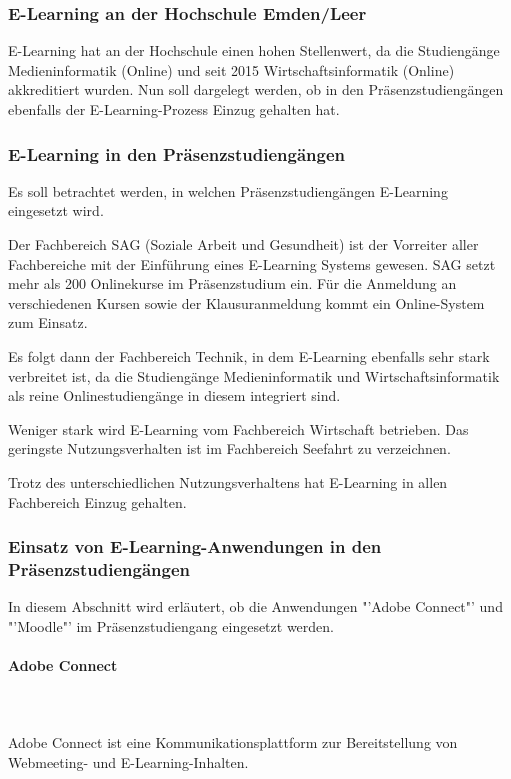 \subsubsection{E-Learning an der Hochschule Emden/Leer}
E-Learning hat an der Hochschule einen hohen Stellenwert, da die Studiengänge Medieninformatik (Online) und seit 2015 Wirtschaftsinformatik (Online) akkreditiert  wurden. Nun soll dargelegt werden, ob in den Präsenzstudiengängen ebenfalls der E-Learning-Prozess Einzug gehalten hat.

\subsubsection{E-Learning in den Präsenzstudiengängen}
Es soll betrachtet werden, in welchen Präsenzstudiengängen E-Learning eingesetzt wird.

Der Fachbereich SAG (Soziale Arbeit und Gesundheit) ist der Vorreiter aller Fachbereiche mit der Einführung eines E-Learning Systems gewesen. SAG setzt mehr als 200 Onlinekurse im Präsenzstudium ein. Für die Anmeldung an verschiedenen Kursen sowie der Klausuranmeldung kommt ein Online-System zum Einsatz.

Es folgt dann der Fachbereich Technik, in dem E-Learning ebenfalls sehr stark verbreitet ist, da die Studiengänge Medieninformatik und Wirtschaftsinformatik als reine Onlinestudiengänge in diesem integriert sind.

Weniger stark wird E-Learning vom Fachbereich Wirtschaft betrieben. Das geringste Nutzungsverhalten ist im Fachbereich Seefahrt zu verzeichnen.

Trotz des unterschiedlichen Nutzungsverhaltens hat E-Learning in allen Fachbereich Einzug gehalten.

\subsubsection[Einsatz von E-Learning-Anwendungen]{Einsatz von E-Learning-Anwendungen in den Präsenzstudiengängen}
In diesem Abschnitt wird erläutert, ob die Anwendungen "'Adobe Connect"' und "'Moodle"' im Präsenzstudiengang eingesetzt werden.

\paragraph{Adobe Connect}\mbox{} \\\\
Adobe Connect ist eine Kommunikationsplattform zur Bereitstellung von Webmeeting- und E-Learning-Inhalten.

